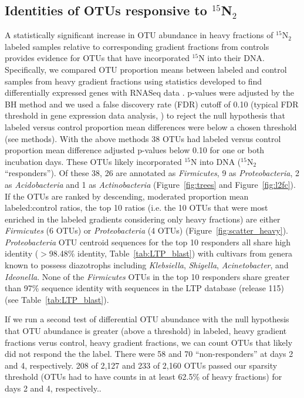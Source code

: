 \subsection{Identities of OTUs responsive to $^{15}$N$_{2}$} 
A statistically significant increase in OTU abundance in heavy fractions of
$^{15}$N$_{2}$ labeled samples relative to corresponding gradient fractions
from controls provides evidence for OTUs that have incorporated $^{15}$N into
their DNA. Specifically, we compared OTU proportion means between labeled and
control samples from heavy gradient fractions using statistics developed to
find differentially expressed genes with RNASeq data \citep{24699258,
Love_2014}. p-values were adjusted by the BH method \citep{citeulike:1042553}
and we used a false discovery rate (FDR) cutoff of 0.10 (typical FDR threshold
in gene expression data analysis, \citep{Love_2014}) to reject the null
hypothesis that labeled versus control proportion mean differences were below a
chosen threshold (see methods). With the above methods 38 OTUs had labeled
versus control proportion mean difference adjusted p-values below 0.10 for one
or both incubation days.  These OTUs likely incorporated $^{15}$N into DNA
($^{15}$N$_{2}$ ``responders''). Of these 38, 26 are annotated as
\textit{Firmicutes}, 9 as \textit{Proteobacteria}, 2 as \textit{Acidobacteria}
and 1 as \textit{Actinobacteria} (Figure~\ref{fig:trees} and
Figure~\ref{fig:l2fc}). If the OTUs are ranked by descending, moderated
proportion mean labeled:control ratios, the top 10 ratios (i.e. the 10 OTUs
that were most enriched in the labeled gradients considering only heavy
fractions) are either \textit{Firmicutes} (6 OTUs) or \textit{Proteobacteria}
(4 OTUs) (Figure~\ref{fig:scatter_heavy}).  \textit{Proteobacteria} OTU
centroid sequences for the top 10 responders all share high identity
($>$98.48\% identity, Table~\ref{tab:LTP_blast}) with cultivars from genera
known to possess diazotrophs including \textit{Klebsiella}, \textit{Shigella},
\textit{Acinetobacter}, and \textit{Ideonella}. None of the \textit{Firmicutes}
OTUs in the top 10 responders share greater than 97\% sequence identity with
sequences in the LTP database (release 115) (see Table~\ref{tab:LTP_blast}).

If we run a second test of differential OTU abundance with the null hypothesis
that OTU abundance is greater (above a threshold) in labeled, heavy gradient
fractions verus control, heavy gradient fractions, we can count OTUs that likely
did not respond the the label. There were 58 and 70 ``non-responders'' at days
2 and 4, respectively. 208 of 2,127 and 233 of 2,160 OTUs passed our sparsity
threshold (OTUs had to have counts in at least 62.5\% of heavy fractions) for
days 2 and 4, respectively..

